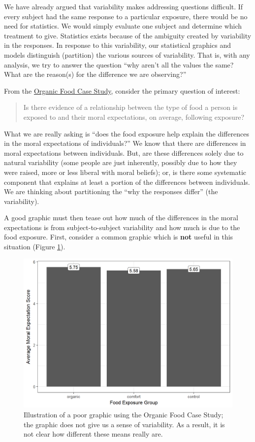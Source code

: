 \documentclass[]{book}
\theoremstyle{definition}
\theoremstyle{definition}
\theoremstyle{definition}
\theoremstyle{remark}
\begin{document}
We have already argued that variability makes addressing questions
difficult. If every subject had the same response to a particular
exposure, there would be no need for statistics. We would simply
evaluate one subject and determine which treatment to give. Statistics
exists because of the ambiguity created by variability in the responses.
In response to this variability, our statistical graphics and models
distinguish (partition) the various sources of variability. That is,
with any analysis, we try to answer the question ``why aren't all the
values the same? What are the reason(s) for the difference we are
observing?''

From the \protect\hyperlink{CaseOrganic}{Organic Food Case Study},
consider the primary question of interest:

\begin{quote}
Is there evidence of a relationship between the type of food a person is
exposed to and their moral expectations, on average, following exposure?
\end{quote}

What we are really asking is ``does the food exposure help explain the
differences in the moral expectations of individuals?'' We know that
there are differences in moral expectations between individuals. But,
are these differences solely due to natural variability (some people are
just inherently, possibly due to how they were raised, more or less
liberal with moral beliefs); or, is there some systematic component that
explains at least a portion of the differences between individuals. We
are thinking about partitioning the ``why the responses differ'' (the
variability).

A good graphic must then tease out how much of the differences in the
moral expectations is from subject-to-subject variability and how much
is due to the food exposure. First, consider a common graphic which is
\textbf{not} useful in this situation (Figure
\ref{fig:anovasummaries-bad-bar}).

\begin{figure}

{\centering \includegraphics[width=0.8\linewidth]{./Images/anovasummaries-bad-bar-1} 

}

\caption{Illustration of a poor graphic using the Organic Food Case Study; the graphic does not give us a sense of variability.  As a result, it is not clear how different these means really are.}\label{fig:anovasummaries-bad-bar}
\end{figure}
\end{document}
